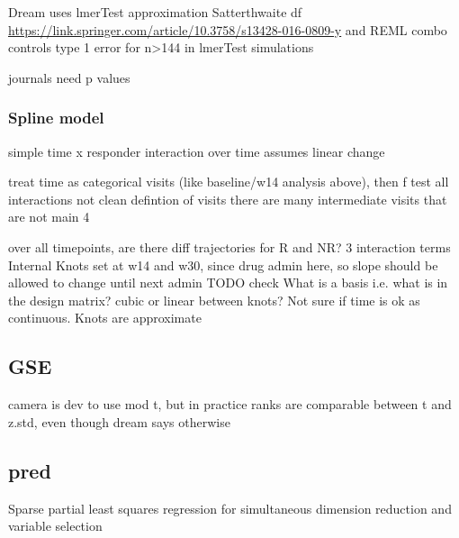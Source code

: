 \begin{outline}
Dream uses lmerTest approximation Satterthwaite df \url{https://link.springer.com/article/10.3758/s13428-016-0809-y} and REML
combo controls type 1 error for n>144 in lmerTest simulations

journals need p values
%

\subsubsection{Spline model}

simple time x responder interaction over time
    assumes linear change

treat time as categorical visits (like baseline/w14 analysis above), then f test all interactions
    not clean defintion of visits
    there are many intermediate visits that are not main 4

over all timepoints, are there diff trajectories for R and NR?
3 interaction terms
Internal Knots set at w14 and w30, since drug admin here, so slope should be allowed to change until next admin
TODO check What is a basis i.e. what is in the design matrix?
cubic or linear between knots?
Not sure if time is ok as continuous. Knots are approximate

\subsection{GSE}

camera is dev to use mod t, but in practice ranks are comparable between t and z.std, even though dream says otherwise

\subsection{pred}

Sparse partial least squares regression for simultaneous dimension reduction and variable selection


\end{outline}
